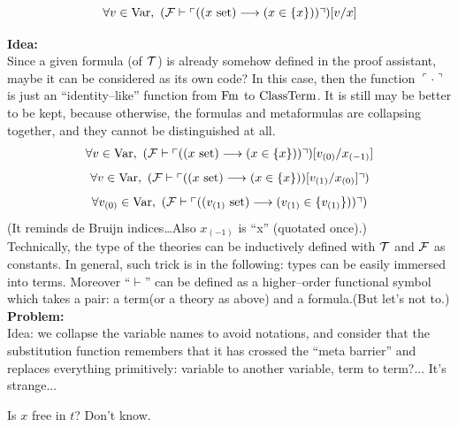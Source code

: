 \[
\forall v\in \mathrm{Var},\ ({\mathcal{F}}\vdash \ulcorner((x \mathrm{\ set})\longrightarrow (x\in \{x\}))\urcorner)[v/x]
\]

\textbf{Idea:}\\
Since a given formula (of $\mathcal{T}$) is already somehow defined in the proof assistant, maybe it can be considered as its own code? In this case, then the function $\ulcorner\cdot\urcorner$ is just an ``identity--like'' function from $\mathrm{Fm}$ to ${\text{ClassTerm}}$. It is still may be better to be kept, because otherwise, the formulas and metaformulas are collapsing together, and they cannot be distinguished at all.
\[
\forall v\in \mathrm{Var},\ ({\mathcal{F}}\vdash \ulcorner((x \mathrm{\ set})\longrightarrow (x\in \{x\}))\urcorner)[v_{(0)}/x_{(-1)}]
\]
\[
\forall v\in \mathrm{Var},\ ({\mathcal{F}}\vdash \ulcorner((x \mathrm{\ set})\longrightarrow (x\in \{x\}))[v_{(1)}/x_{(0)}]\urcorner)
\]
\[
\forall v_{(0)}\in \mathrm{Var},\ ({\mathcal{F}}\vdash \ulcorner((v_{(1)} \mathrm{\ set})\longrightarrow (v_{(1)}\in \{v_{(1)}\}))\urcorner)
\]
(It reminds de Bruijn indices\dots Also $x_{(-1)}$ is ``x'' (quotated once).)\\%
Technically, the type of the theories can be inductively defined with $\mathcal{T}$ and ${\mathcal{F}}$ as constants.
In general, such trick is in the following: types can be easily immersed into terms.
Moreover ``$\vdash$'' can be defined as a higher--order functional symbol which takes a pair: a term(or a theory as above) and a formula.(But let's not to.)\\


\textbf{Problem:}\\


Idea: we collapse the variable names to avoid notations, and consider that the substitution function remembers that it has crossed the ``meta barrier'' and replaces everything primitively: variable to another variable, term to term?... It's strange...


Is $x$ free in $t$? Don't know.



